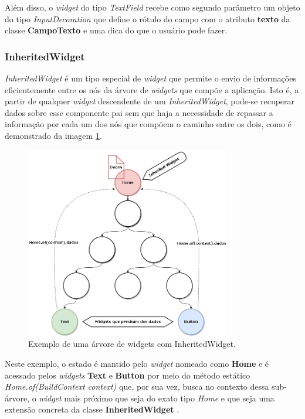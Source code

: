 Além disso, o \textit{widget} do tipo \textit{TextField} recebe como segundo parâmetro um objeto do tipo \textit{InputDecoration} que define o rótulo do campo com o atributo \textbf{texto} da classe \textbf{CampoTexto} e uma dica do que o usuário pode fazer.

\subsubsection{InheritedWidget}
\label{cap2:SubSubSec:InheritedWidget}
\textit{InheritedWidget} \cite{flutter2022inheritedwidget} é um tipo especial de \textit{widget} que permite o envio de informações eficientemente entre os nós da árvore de \textit{widgets} que compõe a aplicação. Isto é, a partir de qualquer \textit{widget} descendente de um \textit{InheritedWidget}, pode-se recuperar dados sobre esse componente pai sem que haja a necessidade de repassar a informação por cada um dos nós que compõem o caminho entre os dois, como é demonstrado da imagem \ref{fig:inherited-widget-diagram}.

\begin{figure}[!ht]
  \centering
  \includegraphics[width=0.8\textwidth]{figuras/cap2/2_2_2_inherited-widget-diagram.png}
  \caption{Exemplo de uma árvore de widgets com InheritedWidget. \protect\cite{Faust2020} \protect\cite{boelens2018}}
  \label{fig:inherited-widget-diagram}
\end{figure}

Neste exemplo, o estado é mantido pelo \textit{widget} nomeado como \textbf{Home} e é acessado pelos \textit{widgets} \textbf{Text} e \textbf{Button} por meio do método estático \textit{Home.of(BuildContext context)} que, por sua vez, busca no contexto dessa sub-árvore, o \textit{widget} mais próximo que seja do exato tipo \textit{Home} e que seja uma extensão concreta da classe \textbf{InheritedWidget} \cite{flutter2022inheritedwidget} \cite{flutter2022dependOnInheritedWidgetOfExactType}.

